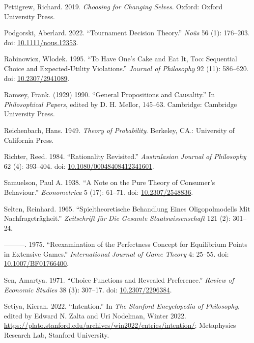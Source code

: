 \documentclass[
  10pt,
  letterpaper,
  DIV=11,
  numbers=noendperiod,
  twoside]{scrartcl}
\newlength{\cslhangindent}
\newenvironment{CSLReferences}[2] %
 {\begin{list}{}{%
  \setlength{\itemindent}{0pt}
  \setlength{\leftmargin}{0pt}
  \setlength{\parsep}{0pt}
  \ifodd #1
   \setlength{\leftmargin}{\cslhangindent}
   \setlength{\itemindent}{-1\cslhangindent}
  \fi
  \setlength{\itemsep}{#2\baselineskip}}}
 {\end{list}}
\begin{document}
\begin{CSLReferences}{1}{0}
Pettigrew, Richard. 2019. \emph{Choosing for Changing Selves}. Oxford:
{O}xford {U}niversity {P}ress.

Podgorski, Aberlard. 2022. {``Tournament Decision Theory.''}
\emph{No{û}s} 56 (1): 176--203. doi:
\href{https://doi.org/10.1111/nous.12353}{10.1111/nous.12353}.

Rabinowicz, Wlodek. 1995. {``To Have One's Cake and Eat It, Too:
Sequential Choice and Expected-Utility Violations.''} \emph{Journal of
Philosophy} 92 (11): 586--620. doi:
\href{https://doi.org/10.2307/2941089}{10.2307/2941089}.

Ramsey, Frank. (1929) 1990. {``General Propositions and Causality.''} In
\emph{Philosophical Papers}, edited by D. H. Mellor, 145--63. Cambridge:
Cambridge University Press.

Reichenbach, Hans. 1949. \emph{Theory of Probability}. Berkeley, CA.:
University of California Press.

Richter, Reed. 1984. {``Rationality Revisited.''} \emph{Australasian
Journal of Philosophy} 62 (4): 393--404. doi:
\href{https://doi.org/10.1080/00048408412341601}{10.1080/00048408412341601}.

Samuelson, Paul A. 1938. {``A Note on the Pure Theory of Consumer's
Behaviour.''} \emph{Econometrica} 5 (17): 61--71. doi:
\href{https://doi.org/10.2307/2548836}{10.2307/2548836}.

Selten, Reinhard. 1965. {``Spieltheoretische Behandlung Eines
Oligopolmodells Mit Nachfragetr{ä}gheit.''} \emph{Zeitschrift f{ü}r Die
Gesamte Staatswissenschaft} 121 (2): 301--24.

---------. 1975. {``Reexamination of the Perfectness Concept for
Equilibrium Points in Extensive Games.''} \emph{International Journal of
Game Theory} 4: 25--55. doi:
\href{https://doi.org/10.1007/BF01766400}{10.1007/BF01766400}.

Sen, Amartya. 1971. {``Choice Functions and Revealed Preference.''}
\emph{Review of Economic Studies} 38 (3): 307--17. doi:
\href{https://doi.org/10.2307/2296384}{10.2307/2296384}.

Setiya, Kieran. 2022. {``{Intention}.''} In \emph{The {Stanford}
Encyclopedia of Philosophy}, edited by Edward N. Zalta and Uri Nodelman,
{W}inter 2022.
\url{https://plato.stanford.edu/archives/win2022/entries/intention/};
Metaphysics Research Lab, Stanford University.


\end{CSLReferences}
\end{document}
